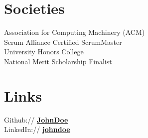 \documentclass[]{deedy-resume-reversed}
\begin{document}
\begin{minipage}[t]{0.33\textwidth}
\section{Societies}
Association for Computing Machinery (ACM)\\
Scrum Alliance Certified ScrumMaster\\
University Honors College\\
National Merit Scholarship Finalist \\
\sectionsep
\section{Links}
Github:// \href{https://github.com/}{\bf JohnDoe} \\
LinkedIn://  \href{https://www.linkedin.com/}{\bf johndoe}
\sectionsep
\end{minipage}
\end{document}
